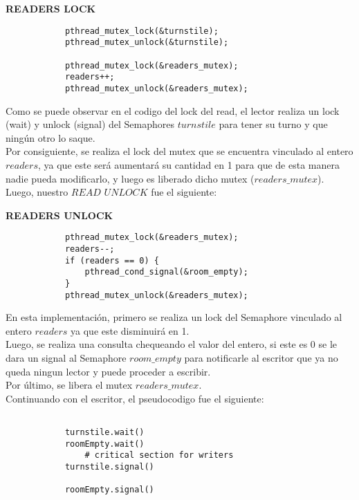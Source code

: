\begin{center}
            \textbf{READERS LOCK}     
\end{center}

 
\begin{verbatim}
            pthread_mutex_lock(&turnstile);
            pthread_mutex_unlock(&turnstile);

            pthread_mutex_lock(&readers_mutex);
            readers++;
            pthread_mutex_unlock(&readers_mutex);
\end{verbatim}

Como se puede observar en el codigo del lock del read, el lector realiza un lock (wait) y unlock (signal) del Semaphores $turnstile$
para tener su turno y que ningún otro lo saque.\\
Por consiguiente, se realiza el lock del mutex que se encuentra vinculado al entero $readers$, ya que este será
aumentará su cantidad en 1 para que de esta manera nadie pueda modificarlo, y luego es liberado dicho mutex ($readers\_mutex$).\\

Luego, nuestro $READ$ $UNLOCK$ fue el siguiente:\\

\begin{center}
            \textbf{READERS UNLOCK}
\end{center}

 
\begin{verbatim}
            pthread_mutex_lock(&readers_mutex);
            readers--;
            if (readers == 0) {
                pthread_cond_signal(&room_empty);		
            }
            pthread_mutex_unlock(&readers_mutex);
\end{verbatim}

En esta implementación, primero se realiza un lock del Semaphore vinculado al entero $readers$ ya que este disminuirá en 1.\\
Luego, se realiza una consulta chequeando el valor del entero, si este es 0 se le dara un signal al Semaphore $room\_empty$
para notificarle al escritor que ya no queda ningun lector y puede proceder a escribir.\\
Por último, se libera el mutex $readers\_mutex$.\\

Continuando con el escritor, el pseudocodigo fue el siguiente:\\

\begin{verbatim}

            turnstile.wait()
            roomEmpty.wait()
                # critical section for writers
            turnstile.signal()

            roomEmpty.signal()

\end{verbatim}

